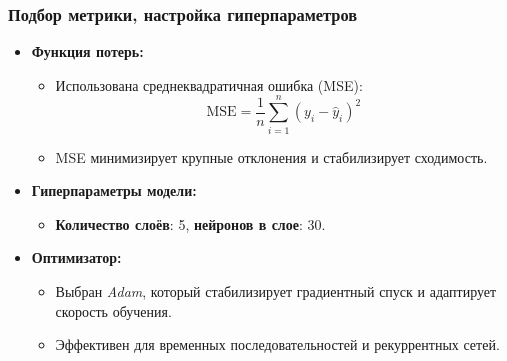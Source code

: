 \documentclass
  [ russian
  , aspectratio=1610 %
  ] {beamer}
\begin{document}
\begin{frame}
    \frametitle{Подбор метрики, настройка гиперпараметров}
    \begin{itemize}
        \item \textbf{Функция потерь:}
        \begin{itemize}
            \item Использована среднеквадратичная ошибка (MSE):
            \[
            \text{MSE} = \frac{1}{n} \sum_{i=1}^{n} (y_i - \hat{y}_i)^2
            \]
            \item MSE минимизирует крупные отклонения и стабилизирует сходимость.
        \end{itemize}
        \item \textbf{Гиперпараметры модели:}
        \begin{itemize}
            \item \textbf{Количество слоёв}: 5, \textbf{нейронов в слое}: 30.
        \end{itemize}
        \item \textbf{Оптимизатор:}
        \begin{itemize}
            \item Выбран \textit{Adam}, который стабилизирует градиентный спуск и адаптирует скорость обучения.
            \item Эффективен для временных последовательностей и рекуррентных сетей.
        \end{itemize}
    \end{itemize}
\end{frame}
\end{document}
